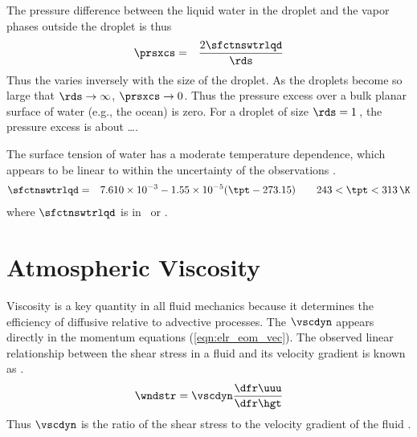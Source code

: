 \documentclass[12pt,twoside]{book}
\begin{document}
The pressure difference between the liquid water in the droplet and
the vapor phases outside the droplet is thus 
\begin{eqnarray}
\prsxcs & = & \frac{2 \sfctnswtrlqd}{\rds}
\label{eqn:prs_xcs_dfn}
\end{eqnarray}
Thus the  varies inversely with the size of
the droplet. 
As the droplets become so large that $\rds \rightarrow \infty$,
$\prsxcs \rightarrow 0$.
Thus the pressure excess over a bulk planar surface of water (e.g.,
the ocean) is zero.
For a droplet of size $\rds = 1$\,\um, the pressure excess is about
\ldots. 

The surface tension of water has a moderate temperature dependence,
which appears to be linear to within the uncertainty of the
observations \cite[][p. 104]{PrK78}.
\begin{eqnarray}
\sfctnswtrlqd & = & 7.610 \times 10^{-3} - 1.55 \times 10^{-5} ( \tpt - 273.15 ) \qquad 243 < \tpt < 313 \mbox{\,\K}
\label{eqn:tns_sfc_PrK78}
\end{eqnarray}
where $\sfctnswtrlqd$ is in \Nxm\ or \jxmS.

\section{Atmospheric Viscosity}\label{sxn:vsc}
Viscosity is a key quantity in all fluid mechanics because it
determines the efficiency of diffusive relative to advective
processes. 
The  $\vscdyn$ appears directly in the
momentum equations (\ref{eqn:elr_eom_vec}).
The observed linear relationship between the shear stress in a fluid
and its velocity gradient is known as . 
\begin{equation}
\wndstr = \vscdyn \frac{\dfr\uuu}{\dfr\hgt}
\label{eqn:nwt_lof}
\end{equation}
Thus $\vscdyn$ is the ratio of the shear stress to the velocity 
gradient of the fluid \cite[][p.~7]{Kun90}.
\end{document}
